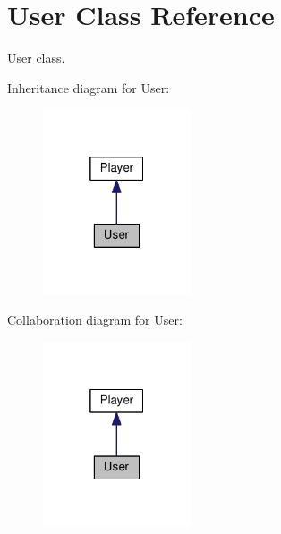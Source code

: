 \hypertarget{classUser}{}\section{User Class Reference}
\label{classUser}


\hyperlink{classUser}{User} class.  




Inheritance diagram for User\+:
\nopagebreak
\begin{figure}[H]
\begin{center}
\leavevmode
\includegraphics[width=124pt]{classUser__inherit__graph}
\end{center}
\end{figure}


Collaboration diagram for User\+:
\nopagebreak
\begin{figure}[H]
\begin{center}
\leavevmode
\includegraphics[width=124pt]{classUser__coll__graph}
\end{center}
\end{figure}
